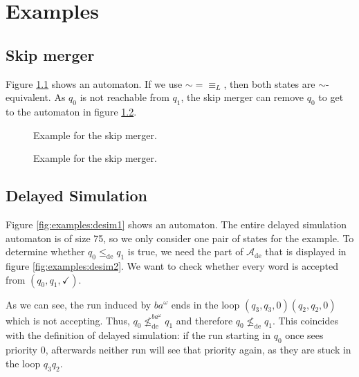 
\chapter{Examples}

\section{Skip merger}
Figure \ref{fig:examples:skip1} shows an automaton. If we use $\sim = \equiv_L$, then both states are $\sim$-equivalent. As $q_0$ is not reachable from $q_1$, the skip merger can remove $q_0$ to get to the automaton in figure \ref{fig:examples:skip2}.

\begin{figure}
\centering
{}
\caption{Example for the skip merger.}
\label{fig:examples:skip1}
\end{figure}


\begin{figure}
\centering
{}
\caption{Example for the skip merger.}
\label{fig:examples:skip2}
\end{figure}



\section{Delayed Simulation}
Figure \ref{fig:examples:desim1} shows an automaton. The entire delayed simulation automaton is of size 75, so we only consider one pair of states for the example. To determine whether $q_0 \leq_\text{de} q_1$ is true, we need the part of $\mathcal{A}_\text{de}$ that is displayed in figure \ref{fig:examples:desim2}. We want to check whether every word is accepted from $(q_0, q_1, \checkmark)$.

As we can see, the run induced by $ba^\omega$ ends in the loop $(q_3, q_3, 0) (q_2, q_2, 0)$ which is not accepting. Thus, $q_0 \not\leq^{ba^\omega}_\text{de} q_1$ and therefore $q_0 \not\leq_\text{de} q_1$. This coincides with the definition of delayed simulation: if the run starting in $q_0$ once sees priority 0, afterwards neither run will see that priority again, as they are stuck in the loop $q_3 q_2$.

